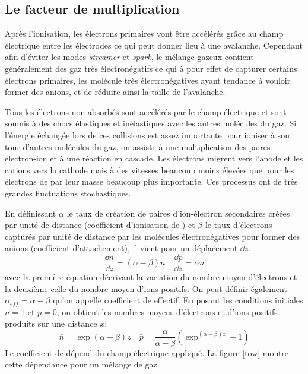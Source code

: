 \subsection{Le facteur de multiplication}
Après l'ionisation, les électrons primaires vont être accélérés grâce au champ électrique entre les électrodes ce qui peut donner lieu à une avalanche. Cependant afin d'éviter les modes \textit{streamer} et \textit{spark}, le mélange gazeux contient généralement des gaz très électronégatifs ce qui à pour effet de capturer certains électrons primaires, les molécule très électronégatives ayant tendance à vouloir former des anions, et de réduire ainsi la taille de l'avalanche. 

Tous les électrons non absorbés sont accélérés par le champ électrique et sont soumis à des chocs élastiques et inélastiques avec les autres molécules du gaz. Si l'énergie échangée lors de ces collisions est assez importante pour ioniser à son tour d'autres molécules du gaz, on assiste à une multiplication des paires électron-ion et à une réaction en cascade. Les électrons migrent vers l'anode et les cations vers la cathode mais à des vitesses beaucoup moins élevées que pour les électrons de par leur masse beaucoup plus importante. Ces processus ont de très grandes fluctuations stochastiques.

En définissant $\alpha$ le taux de création de paires d'ion-électron secondaires créées par unité de distance (coefficient d'ionisation de ) et  $\beta$ le taux d'électrons capturés par unité de distance par les molécules électronégatives pour former des anions (coefficient d'attachement), il vient pour un déplacement  $\dd z$.
\begin{equation}
	\frac{\dd \bar{n}}{\dd z}=(\alpha-\beta)\bar{n} \quad  \frac{\dd \bar{p}}{\dd z}=\alpha\bar{n} 
\end{equation}
avec la première équation décrivant la variation du nombre moyen d'électrons et la deuxième celle du nombre moyen d'ions positifs. On peut définir également $\alpha_{eff}=\alpha-\beta$ qu'on appelle coefficient de  effectif. En posant les conditions initiales $\bar{n}=1$ et $\bar{p}=0$, on obtient les nombres moyens d'électrons et d'ions positifs produits sur une distance $x$: 
\begin{equation}
\bar{n}=\exp(\alpha-\beta)z \quad \bar{p}=\frac{\alpha}{\alpha-\beta}\left(\exp^{(\alpha-\beta)z}-1\right)
\end{equation}
Le coefficient de  dépend du champ électrique appliqué. La figure \ref{tow} montre cette dépendance pour un mélange de gaz.

